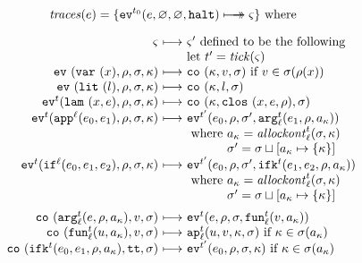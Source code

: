 \documentclass[preprint,onecolumn,9pt]{sigplanconf} %
\begin{document}
\begin{figure}
\small
\begin{gather*}
\begin{align*}
\traces(\mexp) &= \{ \ev[^{\mtcntr}]{\mexp,\varnothing,\varnothing,\kmt} \multimachstep \mstate \} \text{ where }
\end{align*}
\\[2mm]
\begin{array}{@{}r@{\ }c@{\ }l@{}}
\mstate &\machstep&\mstate' \text{ defined to be the following} \\
&&\text{let } \mcntr' =\tick(\mstate) \\
\ev{\svar\mvar,\menv,\msto,\mkont} &\machstep&
\co{\mkont,\mval,\msto}
\text{ if }\mval \in \msto(\menv(\mvar))
\\
\ev{\slit\mlit,\menv,\msto,\mkont} &\machstep&
\co{\mkont,\mlit,\msto}
\\
\ev[^\mcntr]{\slam\mvar\mexp,\menv,\msto,\mkont} &\machstep&
\co{\mkont,\clos{\mvar,\mexp,\menv},\msto}
\\
\ev[^\mcntr]{\sapp[^\mlab]{\mexpi0}{\mexpi1},\menv,\msto,\mkont} &\machstep&
\ev[^{\mcntr'}]{\mexpi{0},\menv,\msto',\kar[_\mlab^\mcntr]{\mexpi{1},\menv,\mkaddr}}
\\
&&
\text{ where }\mkaddr = \allockont^\mcntr_\mlab(\msto,\mkont) \\
&&\phantom{\text{ where }}\msto' = \msto\sqcup[\mkaddr \mapsto \setof{\mkont}]
\\
\ev[^\mcntr]{\sif[^\mlab]{\mexpi0}{\mexpi1}{\mexpi2},\menv,\msto,\mkont} &\machstep&
\ev[^{\mcntr'}]{\mexpi0,\menv,\msto',\kif[^\mcntr]{\mexpi1,\mexpi2,\menv,\mkaddr}}
\\
&&
\text{ where }\mkaddr = \allockont^\mcntr_\mlab(\msto,\mkont) \\
&&\phantom{\text{ where }}\msto' = \msto\sqcup[\mkaddr \mapsto \setof{\mkont}]
\\[2mm]
\co{\kar[^\mcntr_\mlab]{\mexp,\menv,\mkaddr},\mval,\msto} & \machstep&
\ev[^\mcntr]{\mexp,\menv,\msto,\kfn[^\mcntr_\mlab]{\mval,\mkaddr}}
\\
\co{\kfn[^\mcntr_\mlab]{{\mvalx{u}},\mkaddr},\mval,\msto} & \machstep&
\ap[^\mcntr_\mlab]{\mvalx{u},\mval,\mkont,\msto}
\text{ if }\mkont \in \msto(\mkaddr)
\\
\co{\kif[^\mcntr]{\mexpi0,\mexpi1,\menv,\mkaddr},\strue,\msto} & \machstep&
\ev[^{\mcntr'}]{\mexpi0,\menv,\msto,\mkont}
\text{ if }\mkont\in\msto(\mkaddr)

\end{array}
\end{gather*}
\end{figure}
\end{document}
